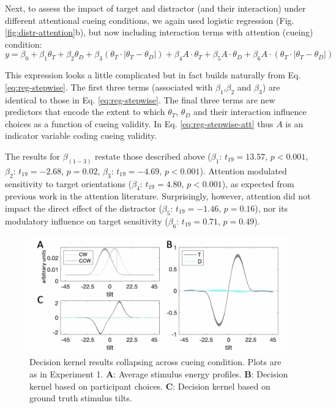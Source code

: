 \documentclass[a4paper, nobind]{templates/ociamthesis}
\begin{document}
Next, to assess the impact of target and distractor (and their interaction) under different attentional cueing conditions, we again used logistic regression (Fig. \ref{fig:distr-attention}b), but now including interaction terms with attention (cueing) condition:
\begin{equation}
y = \beta_0 + \beta_1\theta_T + \beta_2\theta_D + \beta_3(\theta_T\cdot|\theta_T-\theta_D|) + \beta_4A\cdot\theta_T + \beta_5A\cdot\theta_D + \beta_6A\cdot(\theta_T\cdot|\theta_T-\theta_D|)
\label{eq:reg-stepwise-att}
\end{equation}

This expression looks a little complicated but in fact builds naturally from Eq. \eqref{eq:reg-stepwise}. The first three terms (associated with \(\beta_1\),\(\beta_2\) and \(\beta_3\)) are identical to those in Eq. \eqref{eq:reg-stepwise}. The final three terms are new predictors that encode the extent to which \(\theta_T\), \(\theta_D\) and their interaction influence choices as a function of cueing validity. In Eq. \eqref{eq:reg-stepwise-att} thus \(A\) is an indicator variable coding cueing validity.

The results for \(\beta_{(1-3)}\) restate those described above (\(\beta_1\): \(t_{19}=13.57\), \(p<0.001\), \(\beta_2\): \(t_{19}=-2.68\), \(p=0.02\), \(\beta_3\): \(t_{19}=-4.69\), \(p<0.001\)). Attention modulated sensitivity to target orientations (\(\beta_4\): \(t_{19}=4.80\), \(p<0.001\)), as expected from previous work in the attention literature. Surprisingly, however, attention did not impact the direct effect of the distractor (\(\beta_5\): \(t_{19}=-1.46\), \(p=0.16\)), nor its modulatory influence on target sensitivity (\(\beta_6\): \(t_{19}=0.71\), \(p=0.49\)).

\begin{figure}

{\centering \includegraphics[width=1\linewidth]{figures/distr-kernels-c} 

}

\caption[Experiment 3, Decision kernel results]{Decision kernel results collapsing across cueing condition. Plots are as in Experiment 1. $\textbf{A:}$ Average stimulus energy profiles. $\textbf{B:}$ Decision kernel based on participant choices. $\textbf{C:}$ Decision kernel based on ground truth stimulus tilts.}\label{fig:distr-kernels-c}
\end{figure}
\end{document}
